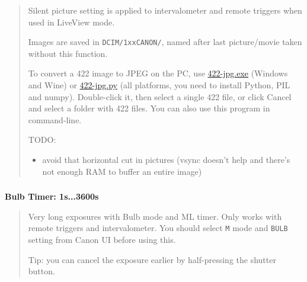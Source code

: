 \documentclass[a4paper,english]{article}
\begin{document}
\begin{quote}
\begin{itemize}
\begin{itemize}
\end{itemize}

\end{itemize}

Silent picture setting is applied to intervalometer and remote triggers when used in LiveView mode.

Images are saved in \texttt{DCIM/1xxCANON/}, named after last picture/movie taken without this function.

To convert a 422 image to JPEG on the PC, use \href{https://bitbucket.org/hudson/magic-lantern/downloads/422-jpg-v2.exe}{422-jpg.exe} (Windows and Wine) or \href{https://bitbucket.org/hudson/magic-lantern/src/tip/422-jpg.py}{422-jpg.py} (all platforms, you need to install Python, PIL and numpy). Double-click it, then select a single 422 file, or click Cancel and select a folder with 422 files. You can also use this program in command-line.

TODO:
%
\begin{itemize}

\item avoid that horizontal cut in pictures (vsync doesn't help and there's not enough RAM to buffer an entire image)

\end{itemize}

\end{quote}
\vspace{-10mm}\subsubsection*{}\label{bulb-timer}
\textbf{Bulb Timer: 1s...3600s}
%
\begin{quote}

Very long exposures with Bulb mode and ML timer. Only works with remote triggers and intervalometer. You should select \texttt{M} mode and \texttt{BULB} setting from Canon UI before using this.

Tip: you can cancel the exposure earlier by half-pressing the shutter button.

\end{quote}
\vspace{-10mm}\subsubsection*{}\label{image-settings}

\end{document}
